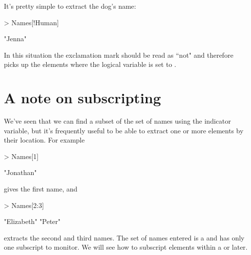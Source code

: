 It's pretty simple to extract the dog's name:
\begin{Schunk}
\begin{Sinput}
> Names[!Human]
\end{Sinput}
\begin{Soutput}
[1] "Jenna"
\end{Soutput}
\end{Schunk}
In this situation the exclamation mark should be read as ``not" and therefore picks up the elements where the logical variable is set to .

\section{A note on subscripting}

We've seen that we can find a subset of the set of names using the indicator variable, but it's frequently useful to be able to extract one or more elements by their location. For example
\begin{Schunk}
\begin{Sinput}
> Names[1]
\end{Sinput}
\begin{Soutput}
[1] "Jonathan"
\end{Soutput}
\end{Schunk}
gives the first name, and 
\begin{Schunk}
\begin{Sinput}
> Names[2:3]
\end{Sinput}
\begin{Soutput}
[1] "Elizabeth" "Peter"    
\end{Soutput}
\end{Schunk}
extracts the second and third names. The set of names entered is a  and has only one subscript to monitor. We will see how to subscript elements within a  or  later.

